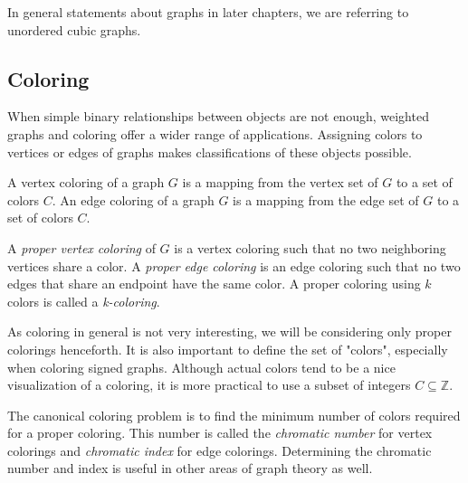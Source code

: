 \begin{figure}[h]
    \centering
\end{figure}

In general statements about graphs in later chapters, we are referring to unordered cubic graphs.

\subsection{Coloring}

When simple binary relationships between objects are not enough, weighted graphs and coloring offer a wider range of applications. Assigning colors to vertices or edges of graphs makes classifications of these objects possible.

\begin{definition}
    A vertex coloring of a graph $G$ is a mapping from the vertex set of $G$ to a set of colors $C$. An edge coloring of a graph $G$ is a mapping from the edge set of $G$ to a set of colors $C$.
\end{definition}

\begin{definition}\label{proper-coloring}
    A \textit{proper vertex coloring} of $G$ is a vertex coloring such that no two neighboring vertices share a color. A \textit{proper edge coloring} is an edge coloring such that no two edges that share an endpoint have the same color. A proper coloring using $k$ colors is called a \textit{k-coloring}.
\end{definition}

As coloring in general is not very interesting, we will be considering only proper colorings henceforth. It is also important to define the set of "colors", especially when coloring signed graphs. Although actual colors tend to be a nice visualization of a coloring, it is more practical to use a subset of integers $C \subseteq \mathbb{Z}$.

The canonical coloring problem is to find the minimum number of colors required for a proper coloring. This number is called the \textit{chromatic number} for vertex colorings and \textit{chromatic index} for edge colorings. Determining the chromatic number and index is useful in other areas of graph theory as well.


